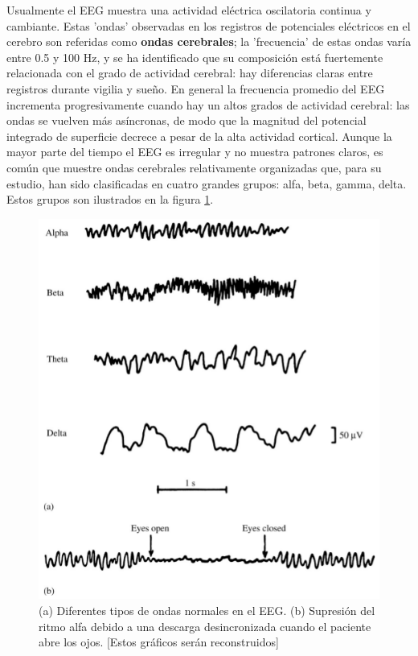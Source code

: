 \documentclass[12pt,a4paper]{mitthesis}
\begin{document}
Usualmente el EEG muestra una actividad el\'ectrica oscilatoria continua y cambiante. 
Estas 'ondas' observadas en los registros de potenciales el\'ectricos en el cerebro son referidas 
como \textbf{ondas cerebrales}; la 'frecuencia' de estas ondas var\'ia entre 0.5 y 100 Hz, y se ha 
identificado que su composici\'on est\'a fuertemente relacionada con el grado de actividad cerebral: 
hay diferencias claras entre registros durante vigilia y sue\~no.
En general la frecuencia promedio del EEG incrementa progresivamente cuando hay un altos grados 
de actividad cerebral: las ondas se vuelven m\'as as\'incronas, de modo que la magnitud del 
potencial integrado de superficie decrece a pesar de la alta actividad cortical.
Aunque la mayor parte del tiempo el EEG es irregular y no muestra patrones claros, es com\'un que 
muestre ondas cerebrales relativamente organizadas que, para su estudio, han sido clasificadas en 
cuatro grandes grupos: alfa, beta, gamma, delta.
Estos grupos son ilustrados en la figura \ref{ritmos}.

\begin{figure}
\centering
\includegraphics[width=0.5\linewidth]{figura_4.png} 
\caption{(a) Diferentes tipos de ondas normales en el EEG. (b) Supresi\'on del ritmo alfa debido a 
una descarga desincronizada cuando el paciente abre los ojos.
[Estos gr\'aficos ser\'an reconstruidos]
}
\label{ritmos}
\end{figure}
\end{document}
